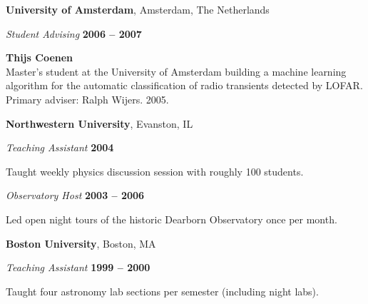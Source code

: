 \documentclass[11pt]{article}
\newcommand{\halfblankline}{\quad\vspace{-0.5\baselineskip}\pagebreak[3]}
\begin{document}
\textbf{University of Amsterdam}, Amsterdam, The Netherlands
\begin{outerlist}

\item[] \textit{Student Advising}
    \hfill \textbf{2006 -- 2007}
    \begin{innerlist}
       \item \textbf{Thijs Coenen}\\
        Master's student at the University of Amsterdam building 
        a machine learning algorithm for the automatic classification 
        of radio transients detected by LOFAR.
        Primary adviser: Ralph Wijers.
        2005.
     \end{innerlist}
\end{outerlist}

\halfblankline

\textbf{Northwestern University}, Evanston, IL
\begin{outerlist}

\item[] \textit{Teaching Assistant} 
    \hfill \textbf{2004}
    \begin{innerlist}
        \item Taught weekly physics discussion session with roughly 100 students.
    \end{innerlist}

\item[] \textit{Observatory Host} 
    \hfill \textbf{2003 -- 2006}
    \begin{innerlist}
        \item Led open night tours of the historic Dearborn Observatory once per month.
    \end{innerlist}
    
\end{outerlist}

\halfblankline

\textbf{Boston University}, Boston, MA
\begin{outerlist}

\item[] \textit{Teaching Assistant} 
    \hfill \textbf{1999 -- 2000}
    \begin{innerlist}
        \item Taught four astronomy lab sections per semester (including night labs).
    \end{innerlist}
\end{outerlist}

\halfblankline
\end{document}
